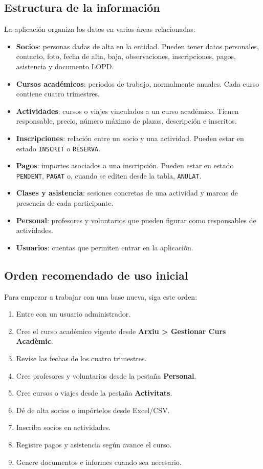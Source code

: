 \documentclass[12pt]{article}
\newcommand{\menu}[1]{\textbf{#1}}
\newcommand{\estado}[1]{\texttt{#1}}
\begin{document}
\subsection{Estructura de la información}
La aplicación organiza los datos en varias áreas relacionadas:
\begin{itemize}
  \item \textbf{Socios}: personas dadas de alta en la entidad. Pueden tener datos personales, contacto, foto, fecha de alta, baja, observaciones, inscripciones, pagos, asistencia y documento LOPD.
  \item \textbf{Cursos académicos}: periodos de trabajo, normalmente anuales. Cada curso contiene cuatro trimestres.
  \item \textbf{Actividades}: cursos o viajes vinculados a un curso académico. Tienen responsable, precio, número máximo de plazas, descripción e inscritos.
  \item \textbf{Inscripciones}: relación entre un socio y una actividad. Pueden estar en estado \estado{INSCRIT} o \estado{RESERVA}.
  \item \textbf{Pagos}: importes asociados a una inscripción. Pueden estar en estado \estado{PENDENT}, \estado{PAGAT} o, cuando se editen desde la tabla, \estado{ANULAT}.
  \item \textbf{Clases y asistencia}: sesiones concretas de una actividad y marcas de presencia de cada participante.
  \item \textbf{Personal}: profesores y voluntarios que pueden figurar como responsables de actividades.
  \item \textbf{Usuarios}: cuentas que permiten entrar en la aplicación.
\end{itemize}

\subsection{Orden recomendado de uso inicial}
Para empezar a trabajar con una base nueva, siga este orden:
\begin{enumerate}
  \item Entre con un usuario administrador.
  \item Cree el curso académico vigente desde \menu{Arxiu > Gestionar Curs Acadèmic}.
  \item Revise las fechas de los cuatro trimestres.
  \item Cree profesores y voluntarios desde la pestaña \menu{Personal}.
  \item Cree cursos o viajes desde la pestaña \menu{Activitats}.
  \item Dé de alta socios o impórtelos desde Excel/CSV.
  \item Inscriba socios en actividades.
  \item Registre pagos y asistencia según avance el curso.
  \item Genere documentos e informes cuando sea necesario.
\end{enumerate}
\end{document}
